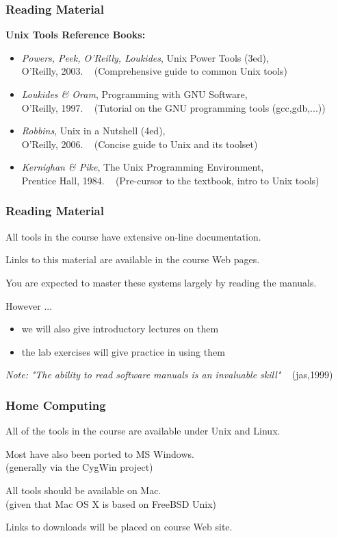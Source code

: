 \begin{frame}
\frametitle{Reading Material}
{\bf{Unix Tools Reference Books:}}
\begin{itemize}
\item  {\em{Powers, Peek, O'Reilly, Loukides}},
	Unix Power Tools (3ed),
	\\{\small O'Reilly, 2003.
		~ (Comprehensive guide to common Unix tools)}
\item  {\em{Loukides \& Oram}},
	Programming with GNU Software,
	\\{\small O'Reilly, 1997.
		~ (Tutorial on the GNU programming tools (gcc,gdb,...))} 
\item  {\em{Robbins}},
	Unix in a Nutshell (4ed),
	\\{\small O'Reilly, 2006.
		~ (Concise guide to Unix and its toolset)}
\item  {\em{Kernighan \& Pike}},
	The Unix Programming Environment,
	\\{\small Prentice Hall, 1984.
		~ (Pre-cursor to the textbook, intro to Unix tools)}
\end{itemize}
\end{frame}

\begin{frame}
\frametitle{Reading Material}
All tools in the course have extensive on-line documentation.

Links to this material are available in the course Web pages.

You are expected to master these systems largely by reading the manuals.

However ...
\begin{itemize}
\item  we will also give introductory lectures on them 
\item  the lab exercises will give practice in using them
\end{itemize}
{\em{Note:}} {\it{"The ability to read software manuals is an invaluable skill"}} ~ {\small (jas,1999)}
\end{frame}

\begin{frame}
\frametitle{Home Computing}
All of the tools in the course are available under Unix and Linux.

Most have also been ported to {\small } MS Windows. \\
{\small (generally via the CygWin project)}

All tools should be available on Mac. \\
{\small (given that Mac OS X is based on FreeBSD Unix)}

Links to downloads will be placed on course Web site.
\end{frame}

